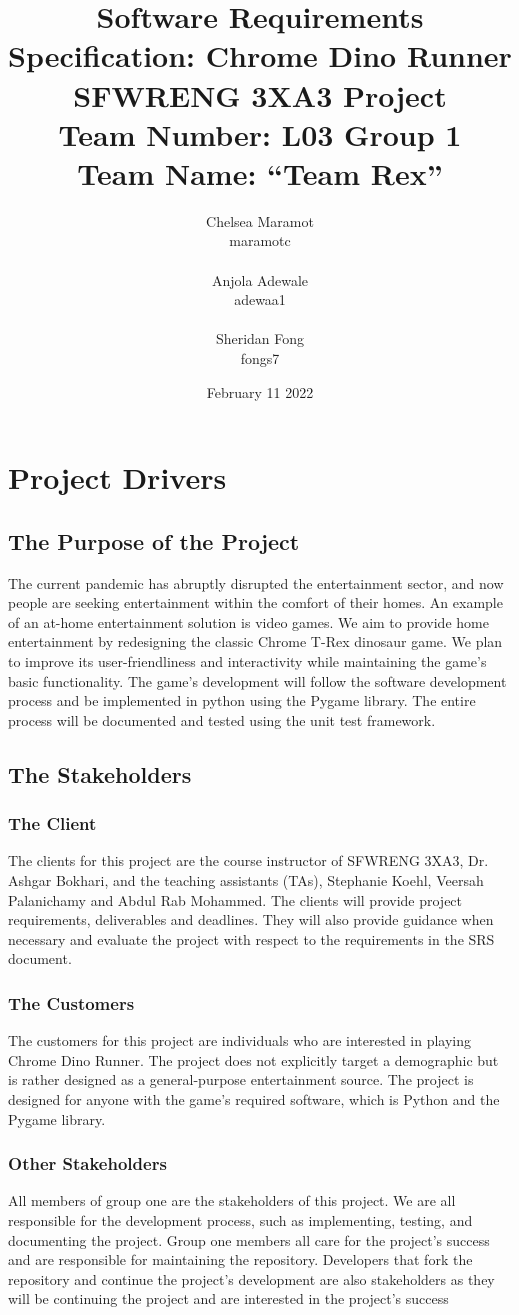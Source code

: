\documentclass[12pt]{article}
\title{Software Requirements Specification: Chrome Dino Runner \\ \bigskip \large SFWRENG 3XA3 Project \\ \bigskip \large Team Number: L03 Group 1 \\ \large Team Name: ``Team Rex'' }
\author{Chelsea Maramot \\ maramotc \\ \\ Anjola Adewale \\ adewaa1 \\ \\ Sheridan Fong \\ fongs7 }
\date{February 11 2022}
\begin{document}
\maketitle
\newpage
\tableofcontents
\section{Project Drivers}
\subsection{The Purpose of the Project}
The current pandemic has abruptly disrupted the entertainment sector, and now people are seeking entertainment within the comfort of their homes. An example of an at-home entertainment solution is video games. We aim to provide home entertainment by redesigning the classic Chrome T-Rex dinosaur game. We plan to improve its user-friendliness and interactivity while maintaining the game’s basic functionality. The game's development will follow the software development process and be implemented in python using the Pygame library. The entire process will be documented and tested using the unit test framework. 
\subsection{The Stakeholders}
\subsubsection{The Client}
The clients for this project are the course instructor of SFWRENG 3XA3, Dr. Ashgar Bokhari, and the teaching assistants (TAs), Stephanie Koehl, Veersah Palanichamy and Abdul Rab Mohammed. The clients will provide project requirements, deliverables and deadlines. They will also provide guidance when necessary and evaluate the project with respect to the requirements in the SRS document. 
\subsubsection{The Customers}
The customers for this project are individuals who are interested in playing Chrome Dino Runner. The project does not explicitly target a demographic but is rather designed as a general-purpose entertainment source. The project is designed for anyone with the game's required software, which is Python and the Pygame library. 
\subsubsection{Other Stakeholders}
All members of group one are the stakeholders of this project. We are all responsible for the development process, such as implementing, testing, and documenting the project. Group one members all care for the project's success and are responsible for maintaining the repository. Developers that fork the repository and continue the project's development are also stakeholders as they will be continuing the project and are interested in the project's success
\end{document}
